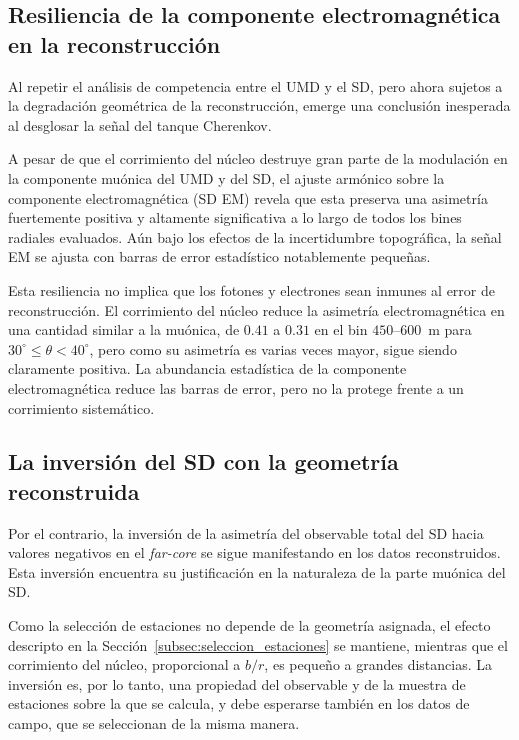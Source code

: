 \subsection{Resiliencia de la componente electromagnética en la reconstrucción}
\label{subsec:em_rec}

Al repetir el análisis de competencia entre el UMD y el SD, pero ahora sujetos a la degradación geométrica de la reconstrucción, emerge una conclusión inesperada al desglosar la señal del tanque Cherenkov.

A pesar de que el corrimiento del núcleo destruye gran parte de la modulación en la componente muónica del UMD y del SD, el ajuste armónico sobre la componente electromagnética (SD EM) revela que esta preserva una asimetría fuertemente positiva y altamente significativa a lo largo de todos los bines radiales evaluados. Aún bajo los efectos de la incertidumbre topográfica, la señal EM se ajusta con barras de error estadístico notablemente pequeñas.

Esta resiliencia no implica que los fotones y electrones sean inmunes al error de reconstrucción. El corrimiento del núcleo reduce la asimetría electromagnética en una cantidad similar a la muónica, de $0.41$ a $0.31$ en el bin $450$--$600$~m para $30^\circ \leq \theta < 40^\circ$, pero como su asimetría es varias veces mayor, sigue siendo claramente positiva. La abundancia estadística de la componente electromagnética reduce las barras de error, pero no la protege frente a un corrimiento sistemático.

\subsection{La inversión del SD con la geometría reconstruida}
\label{subsec:inversion_sd_rec}

Por el contrario, la inversión de la asimetría del observable total del SD hacia valores negativos en el \textit{far-core} se sigue manifestando en los datos reconstruidos. Esta inversión encuentra su justificación en la naturaleza de la parte muónica del SD.

Como la selección de estaciones no depende de la geometría asignada, el efecto descripto en la Sección~\ref{subsec:seleccion_estaciones} se mantiene, mientras que el corrimiento del núcleo, proporcional a $b/r$, es pequeño a grandes distancias. La inversión es, por lo tanto, una propiedad del observable y de la muestra de estaciones sobre la que se calcula, y debe esperarse también en los datos de campo, que se seleccionan de la misma manera.


